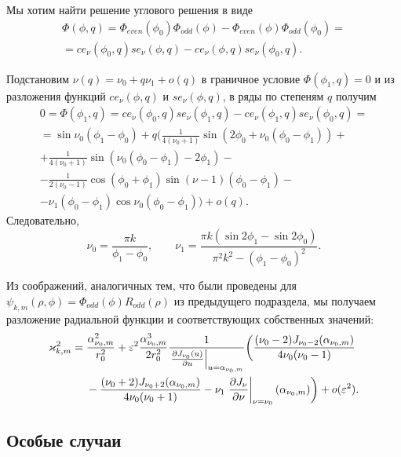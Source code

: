 Мы хотим найти решение углового решения в виде
\begin{multline*}
\Phi(\phi, q) = \Phi_{even}(\phi_0) \Phi_{odd}(\phi) - \Phi_{even}(\phi) \Phi_{odd}(\phi_0)  = \\
=ce_\nu(\phi_0, q) se_\nu(\phi, q) - ce_\nu(\phi, q) se_\nu(\phi_0, q).
\end{multline*}

 
Подстановим $\nu(q) = \nu_0 + q \nu_1 + o(q)$
в граничное условие  $\Phi(\phi_1, q) = 0$
и из разложения функций $ce_\nu(\phi, q)$ и $se_\nu(\phi, q)$, в ряды по степеням  $q$
 получим
\begin{multline*}
0=\Phi(\phi_1, q) = ce_\nu(\phi_0, q) se_\nu(\phi_1, q) -ce_\nu(\phi_1, q) se_\nu(\phi_0, q) = \\
= \sin \nu_0 (\phi_1 - \phi_0) +q \biggl(
\frac{1}{4(\nu_0+1)}  \sin{(2 \phi_0 + \nu_0(\phi_0-\phi_1))}+  \\
+\frac{1}{4(\nu_0+1)} \sin{(\nu_0(\phi_0-\phi_1)-2\phi_1)} - \\
-\frac{1}{2(\nu_0-1)}\cos{(\phi_0 + \phi_1)}\sin{(\nu-1)(\phi_0-\phi_1)} -\\
- \nu_1 (\phi_0 - \phi_1) \cos{\nu_0(\phi_0-\phi_1)} \biggr) + o(q).
\end{multline*}
Следовательно, 
\begin{equation*}
    \nu_0 = \frac{\pi k}{\phi_1-\phi_0}, \qquad \nu_1 = \frac{\pi k (\sin 2\phi_1 - \sin 2 \phi_0)}{\pi^2k^2-(\phi_1-\phi_0)^2}.
\end{equation*}

Из соображений, аналогичных тем, что были проведены для  $\psi_{k, m}(\rho, \phi) = \Phi_{odd}(\phi) R_{odd}(\rho)$ из предыдущего подраздела,
мы получаем разложение радиальной функции и соответствующих собственных значений:
\begin{align*}
    \varkappa_{k, m}^2 ={}& \frac{\alpha_{\nu_0, m}^2}{r_0^2} +  \varepsilon^2 \frac{\alpha_{\nu_0, m}^3}{2 r_0^2}\frac{1}{ \left.\frac{\partial J_{\nu_0}(u)}{\partial u}\right|_{u=\alpha_{\nu_0, m}} }\biggl(\frac{(\nu_0 - 2)J_{\nu_0-2}(\alpha_{\nu_0, m})   }{4\nu_0 (\nu_0-1)} \notag \\
&{}- \frac{(\nu_0 + 2)J_{\nu_0+2}(\alpha_{\nu_0, m})}{4\nu_0 (\nu_0+1)}  - \nu_1 \left.\frac{\partial J_\nu}{\partial \nu}\right|_{\nu = \nu_0}(\alpha_{\nu_0, m})
    \biggr) + o(\varepsilon^2).
\end{align*}

\subsection{Особые случаи}\label{sec:ch2/sec4/subs3}
